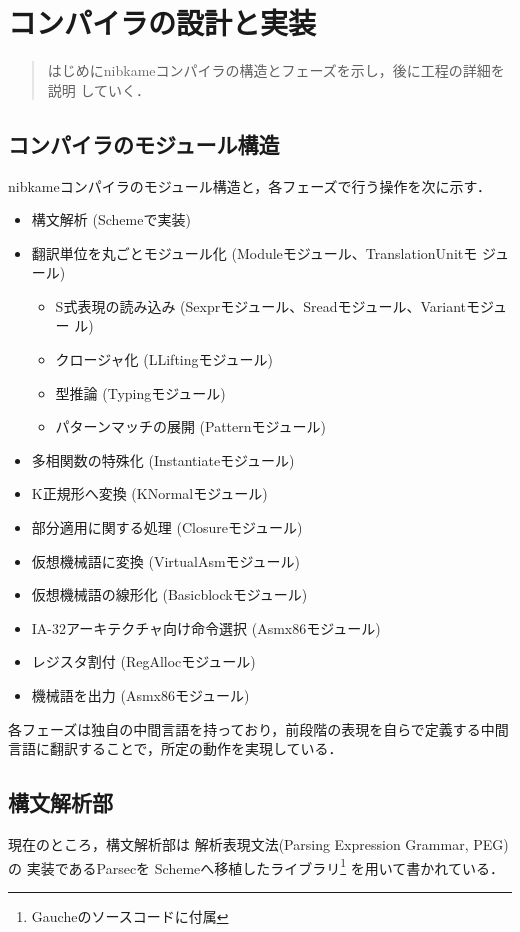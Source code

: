 \documentclass[a4paper,titlepage,disablejfam]{jsbook}
\begin{document}
\chapter{コンパイラの設計と実装}\label{ch:impl}

\begin{abstract}
はじめにnibkameコンパイラの構造とフェーズを示し，後に工程の詳細を説明
していく．
\end{abstract}

\section{コンパイラのモジュール構造}
nibkameコンパイラのモジュール構造と，各フェーズで行う操作を次に示す．

\begin{itemize}
 \item 構文解析 (Schemeで実装)
 \item 翻訳単位を丸ごとモジュール化 (Moduleモジュール、TranslationUnitモ
       ジュール)
 \begin{itemize}
  \item S式表現の読み込み (Sexprモジュール、Sreadモジュール、Variantモジュー
        ル)
  \item クロージャ化 (LLiftingモジュール)
  \item 型推論 (Typingモジュール)
  \item パターンマッチの展開 (Patternモジュール)
 \end{itemize}
 \item 多相関数の特殊化 (Instantiateモジュール)
 \item K正規形へ変換 (KNormalモジュール)
 \item 部分適用に関する処理 (Closureモジュール)
 \item 仮想機械語に変換 (VirtualAsmモジュール)
 \item 仮想機械語の線形化 (Basicblockモジュール)
 \item IA-32アーキテクチャ向け命令選択 (Asmx86モジュール)
 \item レジスタ割付 (RegAllocモジュール)
 \item 機械語を出力 (Asmx86モジュール)
\end{itemize}

各フェーズは独自の中間言語を持っており，前段階の表現を自らで定義する中間
言語に翻訳することで，所定の動作を実現している．


\section{構文解析部}\label{sc:impl-parsing}
現在のところ，構文解析部は
解析表現文法(Parsing Expression Grammar, PEG)\cite{Ford:2004:PEG:982962.964011}の
実装であるParsec\cite{Hutton96monadicparser}を
Schemeへ移植したライブラリ\footnote{Gaucheのソースコードに付属}
を用いて書かれている．
\end{document}
